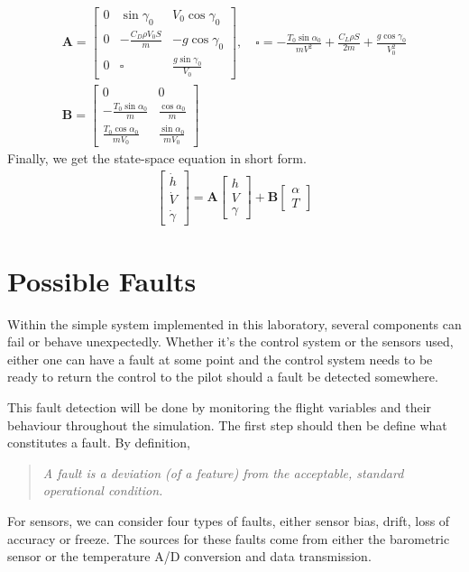 \documentclass[english,palatino]{ist-report}
\begin{document}
\begin{gather}
	\label{eq:a_matrix}
	\mathbf{A} = \left[\begin{matrix}
			0	& \sin\gamma_0				& V_0\cos\gamma_0								\\
			0	& -\frac{C_D\rho V_0S}{m}	& -g\cos\gamma_0								\\
			0	& \square					& \frac{g\sin\gamma_0}{V_0}
		\end{matrix}\right],
		\quad
		\square = -\frac{T_0\sin\alpha_0}{mV^2} + \frac{C_L\rho S}{2m} + \frac{g\cos\gamma_0}{V_0^2} \\
	\label{eq:b_matrix}
	\mathbf{B} = \left[\begin{matrix}
			0								& 0							\\
			-\frac{T_0\sin\alpha_0}{m}		& \frac{\cos\alpha_0}{m}	\\
			\frac{T_0\cos\alpha_0}{mV_0}	& \frac{\sin\alpha_0}{mV_0}
		\end{matrix}\right]
\end{gather}
Finally, we get the state-space equation in short form.
\begin{gather}\label{eq:statespace}
	\left[\begin{matrix} \dot{h} \\ \dot{V} \\ \dot{\gamma} \end{matrix}\right] = \mathbf{A}\left[\begin{matrix} h \\ V \\ \gamma \end{matrix}\right] + \mathbf{B}\left[\begin{matrix} \alpha \\ T \end{matrix}\right]
\end{gather}

\section{Possible Faults}

Within the simple system implemented in this laboratory, several components can fail or behave unexpectedly. Whether it's the control system or the sensors used, either one can have a fault at some point and the control system needs to be ready to return the control to the pilot should a fault be detected somewhere.

This fault detection will be done by monitoring the flight variables and their behaviour throughout the simulation. The first step should then be define what constitutes a fault. By definition,
\begin{quote} \itshape
	A fault is a deviation (of a feature) from the acceptable, standard operational condition.
\end{quote}
For sensors, we can consider four types of faults, either sensor bias, drift, loss of accuracy or freeze. The sources for these faults come from either the barometric sensor or the temperature A/D conversion and data transmission.
\end{document}

